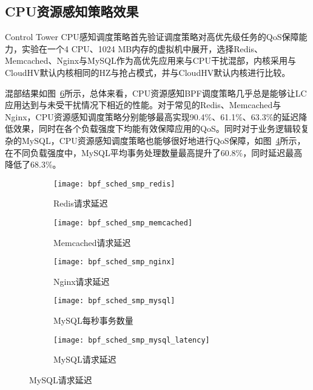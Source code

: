 \subsection{CPU资源感知策略效果}


Control Tower CPU感知调度策略首先验证调度策略对高优先级任务的QoS保障能力，实验在一个4 CPU、1024 MB内存的虚拟机中展开，选择Redis、Memcached、Nginx与MySQL作为高优先应用来与CPU干扰混部，内核采用与CloudHV默认内核相同的HZ与抢占模式，并与CloudHV默认内核进行比较。

混部结果如图~\ref{fig:lc_bpf_sched}所示，总体来看，CPU资源感知BPF调度策略几乎总是能够让LC应用达到与未受干扰情况下相近的性能。对于常见的Redis、Memcached与Nginx，CPU资源感知调度策略分别能够最高实现90.4\%、61.1\%、63.3\%的延迟降低效果，同时在各个负载强度下均能有效保障应用的QoS。同时对于业务逻辑较复杂的MySQL，CPU资源感知调度策略也能够很好地进行QoS保障，如图~\ref{fig:bpf_sched_smp_mysql}所示，在不同负载强度中，MySQL平均事务处理数量最高提升了60.8\%，同时延迟最高降低了68.3\%。

\begin{figure}[H]
    \centering
    \begin{subfigure}[b]{0.32\textwidth}
        \texttt{[image: bpf\_sched\_smp\_redis]}
        \caption{\quad Redis请求延迟}
        \label{fig:bpf_sched_smp_memcached}
    \end{subfigure}
    \begin{subfigure}[b]{0.32\textwidth}
        \texttt{[image: bpf\_sched\_smp\_memcached]}
        \caption{\quad Memcached请求延迟}
        \label{fig:bpf_sched_smp_memcached}
    \end{subfigure}
    \begin{subfigure}[b]{0.32\textwidth}
        \texttt{[image: bpf\_sched\_smp\_nginx]}
        \caption{\quad Nginx请求延迟}
        \label{fig:bpf_sched_smp_memcached}
    \end{subfigure}
    \begin{subfigure}[b]{0.32\textwidth}
        \texttt{[image: bpf\_sched\_smp\_mysql]}
        \caption{\quad MySQL每秒事务数量}
        \label{fig:bpf_sched_smp_mysql}
    \end{subfigure}
    \begin{subfigure}[b]{0.32\textwidth}
        \texttt{[image: bpf\_sched\_smp\_mysql\_latency]}
        \caption{\quad MySQL请求延迟} 
        \label{fig:bpf_sched_smp_mysql_latency}
    \end{subfigure}

\label{fig:lc_bpf_sched}
\end{figure}

